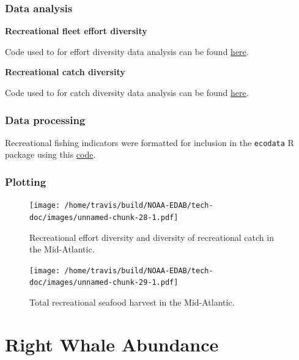 \documentclass[
]{book}
\begin{document}
\hypertarget{data-analysis-28}{%
\subsection{Data analysis}\label{data-analysis-28}}

\textbf{Recreational fleet effort diversity}

Code used to for effort diversity data analysis can be found \href{https://github.com/NOAA-EDAB/tech-doc/blob/master/R/stored_scripts/rec_effort_div_analysis.R}{here}.

\textbf{Recreational catch diversity}

Code used to for catch diversity data analysis can be found \href{https://github.com/NOAA-EDAB/tech-doc/blob/master/R/stored_scripts/rec_catch_div_analysis.R}{here}.

\hypertarget{data-processing-20}{%
\subsection{Data processing}\label{data-processing-20}}

Recreational fishing indicators were formatted for inclusion in the \texttt{ecodata} R package using this \href{https://github.com/NOAA-EDAB/ecodata/blob/master/data-raw/get_rec.R}{code}.

\hypertarget{plotting-22}{%
\subsection{Plotting}\label{plotting-22}}

\begin{figure}
\centering
\texttt{[image: /home/travis/build/NOAA-EDAB/tech-doc/images/unnamed-chunk-28-1.pdf]}
\caption{\label{fig:unnamed-chunk-28}Recreational effort diversity and diversity of recreational catch in the Mid-Atlantic.}
\end{figure}

\begin{figure}
\centering
\texttt{[image: /home/travis/build/NOAA-EDAB/tech-doc/images/unnamed-chunk-29-1.pdf]}
\caption{\label{fig:unnamed-chunk-29}Total recreational seafood harvest in the Mid-Atlantic.}
\end{figure}

\hypertarget{right-whale-abundance}{%
\chapter{Right Whale Abundance}\label{right-whale-abundance}}
\end{document}
